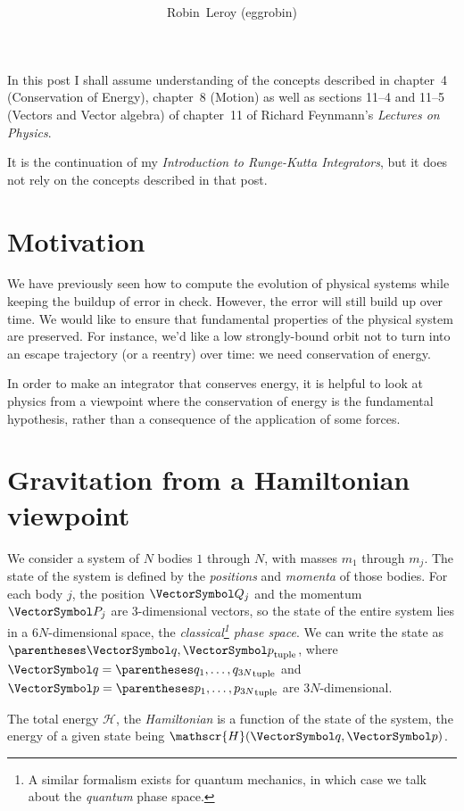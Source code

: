 \documentclass[10pt, a4paper, twoside]{basestyle}
\title{%
\textdisplay{%
An Introduction Hamiltonian Mechanics}%
}
\author{Robin~Leroy (eggrobin)}
\begin{document}
\maketitle
In this post I shall assume understanding of the concepts described in
chapter~4 (Conservation of Energy), chapter~8 (Motion) as well as sections
11--4 and 11--5 (Vectors and Vector algebra) of chapter~11 of Richard
Feynmann's \emph{Lectures on Physics}.

It is the continuation of my \emph{Introduction to Runge-Kutta Integrators},
but it does not rely on the concepts described in that post.

\section{Motivation}
We have previously seen how to compute the evolution of physical systems while
keeping the buildup of error in check. However, the error will still build up
over time. We would like to ensure that fundamental properties of the physical
system are preserved. For instance, we'd like a low strongly-bound orbit not to
turn into an escape trajectory (or a reentry) over time: we need conservation
of energy.

In order to make an integrator that conserves energy, it is helpful to look at
physics from a viewpoint where the conservation of energy is the fundamental
hypothesis, rather than a consequence of the application of some forces.

\newcommand{\Hamiltonian}{\mathscr{H}}
\section{Gravitation from a Hamiltonian viewpoint}
We consider a system of $N$ bodies $1$ through $N$, with masses $m_1$ through
$m_j$. The state of the system is defined by the \emph{positions} and
\emph{momenta} of those bodies. For each body $j$, the position $\vQ_j$ and the
momentum $\vP_j$ are 3-dimensional vectors, so the state of the entire system
lies in a $6N$-dimensional space, the \emph{classical\footnote{A similar
formalism exists for quantum mechanics, in which case we talk about the
\emph{quantum} phase space.} phase space}.
We can write the state as $\tuple{\vq, \vp}$, where $\vq = \tuple{q_1, \dotsc,
q_{3N}}$ and $\vp =  \tuple{p_1, \dotsc, p_{3N}}$ are $3N$-dimensional.

The total energy $\Hamiltonian$, the \emph{Hamiltonian} is a function
of the state of the system, the energy of a given state being $\Hamiltonian(\vq,
\vp)$.
\end{document}
